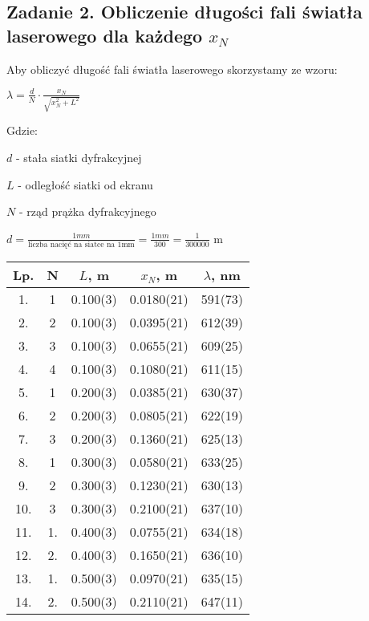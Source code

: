 \documentclass[12pt]{article}
\begin{document}
\subsection*{Zadanie 2. Obliczenie długości fali światła laserowego dla każdego $x_N$}

Aby obliczyć długość fali światła laserowego skorzystamy ze wzoru:
\begin{center}
    $\lambda = \frac{d}{N} \cdot \frac{x_N}{\sqrt{x_N^2+L^2}}$
\end{center}
Gdzie:

$d$ - stała siatki dyfrakcyjnej

$L$ - odległość siatki od ekranu

$N$ - rząd prążka dyfrakcyjnego

$d = \frac{1mm}{\text{liczba nacięć na siatce na 1mm}} = \frac{1mm}{300} =
    \frac{1}{300000}$ m


\begin{center}
    \begin{tabular} { | c | c | c | c | c | }
        \hline
        Lp. & N  & $L$, m   & $x_N$, m   & $\lambda$, nm \\
        \hline
        1.  & 1  & 0.100(3) & 0.0180(21) & 591(73)       \\ \hline
        2.  & 2  & 0.100(3) & 0.0395(21) & 612(39)       \\ \hline
        3.  & 3  & 0.100(3) & 0.0655(21) & 609(25)       \\ \hline
        4.  & 4  & 0.100(3) & 0.1080(21) & 611(15)       \\ \hline
        5.  & 1  & 0.200(3) & 0.0385(21) & 630(37)       \\ \hline
        6.  & 2  & 0.200(3) & 0.0805(21) & 622(19)       \\ \hline
        7.  & 3  & 0.200(3) & 0.1360(21) & 625(13)       \\ \hline
        8.  & 1  & 0.300(3) & 0.0580(21) & 633(25)       \\ \hline
        9.  & 2  & 0.300(3) & 0.1230(21) & 630(13)       \\ \hline
        10. & 3  & 0.300(3) & 0.2100(21) & 637(10)       \\ \hline
        11. & 1. & 0.400(3) & 0.0755(21) & 634(18)       \\ \hline
        12. & 2. & 0.400(3) & 0.1650(21) & 636(10)       \\ \hline
        13. & 1. & 0.500(3) & 0.0970(21) & 635(15)       \\ \hline
        14. & 2. & 0.500(3) & 0.2110(21) & 647(11)       \\
        \hline
    \end{tabular}
\end{center}
\end{document}
